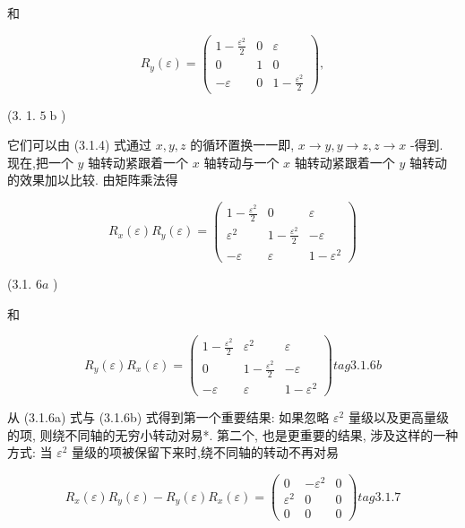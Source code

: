 和

$$
{R}_{y}\left( \varepsilon \right) = \left( \begin{matrix} 1 - \frac{{\varepsilon }^{2}}{2} & 0 & \varepsilon \\ 0 & 1 & 0 \\ - \varepsilon & 0 & 1 - \frac{{\varepsilon }^{2}}{2} \end{matrix}\right) ,
$$

(3. 1. $5\mathrm{\;b}$ )

它们可以由 (3.1.4) 式通过 $x, y, z$ 的循环置换一一即, $x \rightarrow y, y \rightarrow z, z \rightarrow x$ -得到. 现在,把一个 $y$ 轴转动紧跟着一个 $x$ 轴转动与一个 $x$ 轴转动紧跟着一个 $y$ 轴转动的效果加以比较. 由矩阵乘法得

$$
{R}_{x}\left( \varepsilon \right) {R}_{y}\left( \varepsilon \right) = \left( \begin{matrix} 1 - \frac{{\varepsilon }^{2}}{2} & 0 & \varepsilon \\ {\varepsilon }^{2} & 1 - \frac{{\varepsilon }^{2}}{2} & - \varepsilon \\ - \varepsilon & \varepsilon & 1 - {\varepsilon }^{2} \end{matrix}\right)
$$

(3.1. ${6a}$ )

和

$$
{R}_{y}\left( \varepsilon \right) {R}_{x}\left( \varepsilon \right) = \left( \begin{matrix} 1 - \frac{{\varepsilon }^{2}}{2} & {\varepsilon }^{2} & \varepsilon \\ 0 & 1 - \frac{{\varepsilon }^{2}}{2} & - \varepsilon \\ - \varepsilon & \varepsilon & 1 - {\varepsilon }^{2} \end{matrix}\right) tag{3.1.6b}
$$

从 (3.1.6a) 式与 (3.1.6b) 式得到第一个重要结果: 如果忽略 ${\varepsilon }^{2}$ 量级以及更高量级的项, 则绕不同轴的无穷小转动对易*. 第二个, 也是更重要的结果, 涉及这样的一种方式: 当 ${\varepsilon }^{2}$ 量级的项被保留下来时,绕不同轴的转动不再对易

$$
{R}_{x}\left( \varepsilon \right) {R}_{y}\left( \varepsilon \right) - {R}_{y}\left( \varepsilon \right) {R}_{x}\left( \varepsilon \right) = \left( \begin{matrix} 0 & - {\varepsilon }^{2} & 0 \\ {\varepsilon }^{2} & 0 & 0 \\ 0 & 0 & 0 \end{matrix}\right) tag{3. 1.7}
$$

